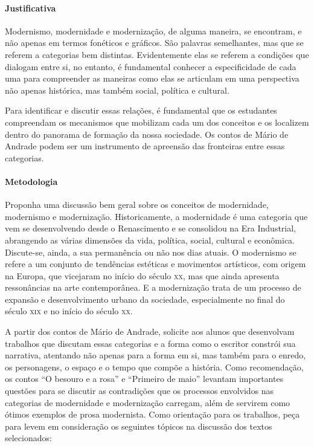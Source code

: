 \documentclass[12pt]{extarticle}
\begin{document}
{\paragraph{Justificativa} Modernismo, modernidade e modernização, de
alguma maneira, se encontram, e não apenas em termos fonéticos e
gráficos. São palavras semelhantes, mas que se referem a categorias bem
distintas. Evidentemente elas se referem a condições que dialogam entre
si, no entanto, é fundamental conhecer a especificidade de cada uma para
compreender as maneiras como elas se articulam em uma perspectiva não
apenas histórica, mas também social, política e cultural.

Para identificar e discutir essas relações, é fundamental que os
estudantes compreendam os mecanismos que mobilizam cada um dos conceitos
e os localizem dentro do panorama de formação da nossa sociedade. Os
contos de Mário de Andrade podem ser um instrumento de apreensão das
fronteiras entre essas categorias.

\paragraph{Metodologia} Proponha uma discussão bem geral sobre os
conceitos de modernidade, modernismo e modernização. Historicamente, a
modernidade é uma categoria que vem se desenvolvendo desde o
Renascimento e se consolidou na Era Industrial, abrangendo as várias
dimensões da vida, política, social, cultural e econômica. Discute-se,
ainda, a sua permanência ou não nos dias atuais. O modernismo se refere
a um conjunto de tendências estéticas e movimentos artísticos, com
origem na Europa, que vicejaram no início do século \textsc{xx}, mas que ainda
apresenta ressonâncias na arte contemporânea. E a modernização trata de
um processo de expansão e desenvolvimento urbano da sociedade,
especialmente no final do século \textsc{xix} e no início do século \textsc{xx}.

A partir dos contos de Mário de Andrade, solicite aos alunos que
desenvolvam trabalhos que discutam essas categorias e a forma como o
escritor constrói sua narrativa, atentando não apenas para a forma em
si, mas também para o enredo, os personagens, o espaço e o tempo que
compõe a história. Como recomendação, os contos ``O besouro e a rosa'' e
``Primeiro de maio'' levantam importantes questões para se discutir as
contradições que os processos envolvidos nas categorias de modernidade e
modernização carregam, além de servirem como ótimos exemplos de prosa
modernista. Como orientação para os trabalhos, peça para levem em
consideração os seguintes tópicos na discussão dos textos selecionados:

}
\end{document}
